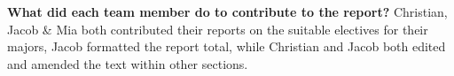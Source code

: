 \begin{itemize}
\textbf{What did each team member do to contribute to the report?}
Christian, Jacob & Mia both contributed their reports on the suitable electives for their majors, Jacob formatted the report total, while Christian and Jacob both edited and amended the text within other sections.
\end{itemize}
